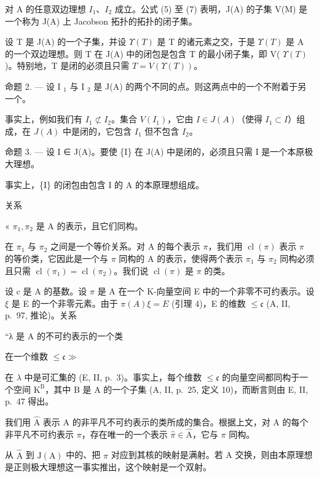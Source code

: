 对 A 的任意双边理想 \(I_{1}\)、\(I_{2}\) 成立。公式 (5) 至 (7) 表明，J(A) 的子集 V(M) 是一个称为 J(A) 上 Jacobson 拓扑的拓扑的闭子集。

设 T 是 J(A) 的一个子集，并设 \(\Upsilon(T)\) 是 T 的诸元素之交，于是 \(\Upsilon(T)\) 是 A 的一个双边理想。则 T 在 J(A) 中的闭包是包含 T 的最小闭子集，即 V( \(\Upsilon(T)\) )。特别地，T 是闭的必须且只需 \(T = V(\Upsilon(T))\)。

命题 2. --- 设 I \(_{1}\) 与 I \(_{2}\) 是 J(A) 的两个不同的点。则这两点中的一个不附着于另一个。

事实上，例如我们有 \(I_{1} \not\subset I_{2}\)。集合 \(V(I_{1})\)，它由 \(I \in J(A)\)（使得 \(I_{1} \subset I\)）组成，在 \(J(A)\) 中是闭的，它包含 \(I_{1}\) 但不包含 \(I_{2}\)。

命题 3. --- 设 I ∈ J(A)。要使 \{I\} 在 J(A) 中是闭的，必须且只需 I 是一个本原极大理想。

事实上，\{I\} 的闭包由包含 I 的 A 的本原理想组成。

关系

« \(\pi_{1},\pi_{2}\) 是 A 的表示，且它们同构。

在 \(\pi_1\) 与 \(\pi_2\) 之间是一个等价关系。对 A 的每个表示 \(\pi\)，我们用 \(\operatorname{cl}(\pi)\) 表示 \(\pi\) 的等价类，它因此是一个与 \(\pi\) 同构的 A 的表示，使得两个表示 \(\pi_1\) 与 \(\pi_2\) 同构必须且只需 \(\operatorname{cl}(\pi_1) = \operatorname{cl}(\pi_2)\)。我们说 \(\operatorname{cl}(\pi)\) 是 \(\pi\) 的类。

设 c 是 A 的基数。设 \(\pi\) 是 A 在一个 K-向量空间 E 中的一个非零不可约表示。设 \(\xi\) 是 E 的一个非零元素。由于 \(\pi(A)\xi = E\) (引理 4)，E 的维数 \(\leqslant\mathfrak{c}\) (A, II, p.~97, 推论)。关系

“λ 是 A 的不可约表示的一个类

在一个维数 \(\leqslant\mathfrak{c}\gg\)

在 \(\lambda\) 中是可汇集的 (E, II, p.~3)。事实上，每个维数 \(\leqslant \mathfrak{c}\) 的向量空间都同构于一个空间 \(\mathrm{K}^{\mathrm{B}}\)，其中 B 是 A 的一个子集 (A, II, p.~25, 定义 10)，而断言则由 E, II, p.~47 得出。

我们用 \(\widehat{\mathrm{A}}\) 表示 A 的非平凡不可约表示的类所成的集合。根据上文，对 A 的每个非平凡不可约表示 \(\pi\)，存在唯一的一个表示 \(\widehat{\pi} \in \widehat{\mathrm{A}}\)，它与 \(\pi\) 同构。

从 \(\hat{\mathrm{A}}\) 到 \(\mathrm{J(A)}\) 中的、把 \(\pi\) 对应到其核的映射是满射。若 A 交换，则由本原理想是正则极大理想这一事实推出，这个映射是一个双射。

